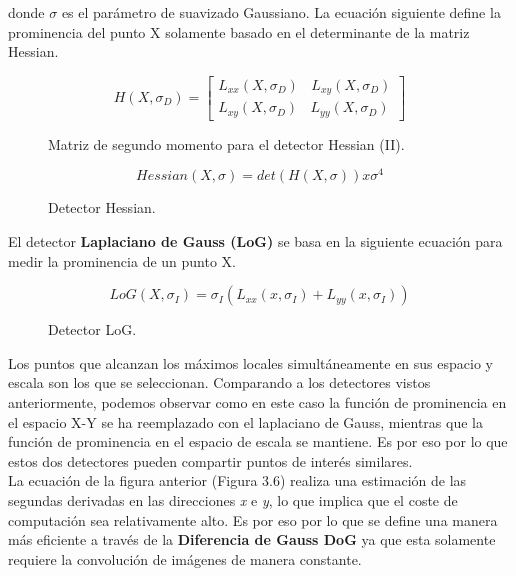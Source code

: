 donde $\sigma$  es el parámetro de suavizado Gaussiano. La ecuación siguiente define la prominencia del punto X solamente basado en el determinante de la matriz Hessian. \\

\begin{figure}[htbp]
\centering
\[
H( X, \sigma _{D} ) = 
\begin{bmatrix}
L_{xx}(X,\sigma_{D}) \:\:\:\: L_{xy}(X,\sigma_{D}) \\
L_{xy}(X,\sigma_{D}) \:\:\:\: L_{yy}(X,\sigma_{D})
\end{bmatrix}
\] 
\caption{Matriz de segundo momento para el detector Hessian (II).} 
\end{figure}

\begin{figure}[htbp]
\centering
\[
Hessian(X, \sigma) = det(H(X,\sigma)) x \sigma^4
\]
\caption{Detector Hessian.} 
\end{figure}

El detector \textbf{Laplaciano de Gauss (LoG)} se basa en la siguiente ecuación para medir la prominencia de un punto X. 

\begin{figure}[htbp]
\centering
\[
LoG(X, \sigma_{I}) = \sigma_{I}(L_{xx}(x,\sigma_{I}) + L_{yy}(x,\sigma_{I}))
\]
\caption{Detector LoG.} 
\end{figure}

Los puntos que alcanzan los máximos locales simultáneamente en sus espacio y escala son los que se seleccionan. Comparando a los detectores vistos anteriormente, podemos observar como en este caso la función de prominencia en el espacio X-Y se ha reemplazado con el laplaciano de Gauss, mientras que la función de prominencia en el espacio de escala se mantiene. Es por eso por lo que estos dos detectores pueden compartir puntos de interés similares. \\

La ecuación de la figura anterior (Figura 3.6) realiza una estimación de las segundas derivadas en las direcciones \textit{x} e \textit{y}, lo que implica que el coste de computación sea relativamente alto. Es por eso por lo que se define una manera más eficiente a través de la \textbf{Diferencia de Gauss DoG} ya que esta solamente requiere la convolución de imágenes de manera constante. \\ \\ \\ \\ \\ \\

